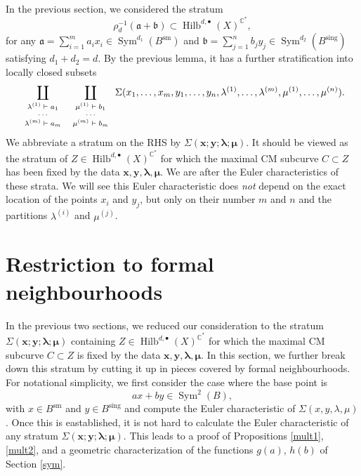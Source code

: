 \documentclass{amsart}
\theoremstyle{definition}
\newcommand{\CC} {\mathbb{C}}          %
\newcommand{\Sym}{\operatorname{Sym}}
\newcommand{\Hilb}{\operatorname{Hilb}}
\newcommand{\sm}{\operatorname{sm}}
\newcommand{\sing}{\operatorname{sing}}
\begin{document}

In the previous section, we considered the stratum
$$
\rho_{d}^{-1} ( \mathfrak{a} + \mathfrak{b} ) \subset \Hilb^{d, \bullet}(X)^{\CC^*},
$$
for any $\mathfrak{a} = \sum_{i=1}^{m} a_i x_i \in \Sym^{d_1}(B^{\sm})$ and $\mathfrak{b} = \sum_{j=1}^{n} b_j y_j \in \Sym^{d_2}(B^{\sing})$ satisfying $d_1+d_2=d$. By the previous lemma, it has a further stratification into locally closed subsets
\begin{equation} \label{comps}
\coprod_{{\scriptsize{\begin{array}{c} \lambda^{(1)} \vdash a_1 \\ \cdots \\ \lambda^{(m)} \vdash a_m \end{array}}}} \coprod_{\scriptsize{\begin{array}{c} \mu^{(1)} \vdash b_1 \\ \cdots \\ \mu^{(m)} \vdash b_m \end{array}}} \Sigma(x_1, \ldots, x_m, y_1, \ldots, y_n, \lambda^{(1)}, \ldots, \lambda^{(m)}, \mu^{(1)}, \ldots, \mu^{(n)}).
\end{equation}
We abbreviate a stratum on the RHS by $\Sigma(\boldsymbol{x};\boldsymbol{y};\boldsymbol{\lambda};\boldsymbol{\mu})$. It should be viewed as the stratum of $Z \in \Hilb^{d,\bullet}(X)^{\CC^*}$ for which the maximal CM subcurve $C \subset Z$ has been fixed by the data $\boldsymbol{x}, \boldsymbol{y}, \boldsymbol{\lambda}, \boldsymbol{\mu}$. We are after the Euler characteristics of these strata. We will see this Euler characteristic does \emph{not} depend on the exact location of the points $x_i$ and $y_j$, but only on their number $m$ and $n$ and the partitions $\lambda^{(i)}$ and $\mu^{(j)}$.


\section{Restriction to formal neighbourhoods} \label{formal}

In the previous two sections, we reduced our consideration to the stratum $\Sigma(\boldsymbol{x};\boldsymbol{y};\boldsymbol{\lambda};\boldsymbol{\mu})$ containing $Z \in \Hilb^{d,\bullet}(X)^{\CC^*}$ for which the maximal CM subcurve $C \subset Z$ is fixed by the data $\boldsymbol{x}, \boldsymbol{y}, \boldsymbol{\lambda}, \boldsymbol{\mu}$. In this section, we further break down this stratum by cutting it up in pieces covered by formal neighbourhoods. For notational simplicity, we first consider the case where the base point is 
$$
a x + b y \in \Sym^2(B),
$$
with $x \in B^{\sm}$ and $y \in B^{\sing}$ and compute the Euler characteristic of $\Sigma(x,y,\lambda,\mu)$. Once this is eastablished, it is not hard to calculate the Euler characteristic of any stratum  $\Sigma(\boldsymbol{x};\boldsymbol{y};\boldsymbol{\lambda};\boldsymbol{\mu})$. This leads to a proof of Propositions \ref{mult1}, \ref{mult2}, and a geometric characterization of the functions $g(a)$, $h(b)$ of Section \ref{sym}.
\end{document}
